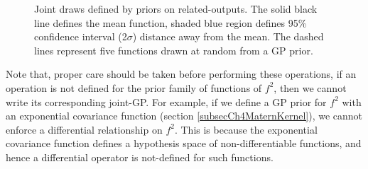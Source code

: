 \begin{figure}[!ht]
  \centering
  \quad
  \caption{Joint draws defined by priors on related-outputs. The solid black line defines the mean function, shaded blue region defines 95\% confidence interval (2$\sigma$) distance away from the mean. The dashed lines represent five functions drawn at random from a GP prior.}
  \label{figJointRelationshipGPPriors}
\end{figure}

Note that, proper care should be taken before performing these operations, if an operation is not defined for the prior family of functions of $f^2$, then we cannot write its corresponding joint-GP. For example, if we define a GP prior for $f^2$ with an exponential covariance function (section \ref{subsecCh4MaternKernel}), we cannot enforce a differential relationship on $f^2$. This is because the exponential covariance function defines a hypothesis space of non-differentiable functions, and hence a differential operator is not-defined for such functions.  

